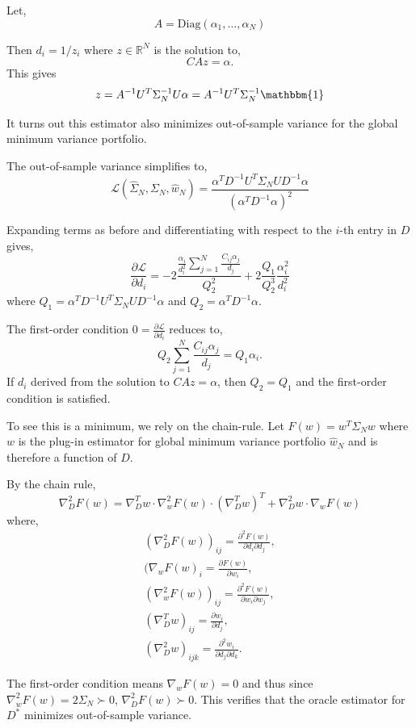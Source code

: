 \documentclass{article}
\begin{document}
Let,
$$
	A = \mathrm{Diag}(\alpha_1, \ldots, \alpha_N)
$$

Then ${d}_i = 1 / z_i$ where $z \in \mathbb{R}^N$ is the solution to,
$$
	C A z = \alpha.
$$
This gives
$$
	z = A^{-1} U^T \Sigma_N^{-1} U \alpha
		 = A^{-1} U^T \Sigma_N^{-1} \mathbbm{1}
$$

It turns out this estimator also minimizes out-of-sample variance for the global
minimum variance portfolio.  

The out-of-sample variance simplifies to,
$$
  \mathcal{L}(\hat{\Sigma}_N, \Sigma_N, \hat{w}_N) = \frac
  	{\alpha^T D^{-1} U^T \Sigma_N U D^{-1} \alpha}
  	{\left( \alpha^T D^{-1} \alpha\right)^2}
$$

Expanding terms as before and differentiating with respect to the $i$-th entry
in $D$ gives,
$$
  \frac{\partial\mathcal{L}}{\partial d_i} = -2 \frac
  	{ \frac{\alpha_i}{d_i^2} \sum_{j=1}^N \frac{C_{ij}\alpha_j}{d_j} }{ Q_2^2 }
    + 2\frac{ Q_1 }{ Q_2^3 } \frac{\alpha_i^2}{d_i^2}
$$
where $Q_1 = \alpha^T D^{-1} U^T \Sigma_N U D^{-1} \alpha$ and $Q_2 = \alpha^T
D^{-1} \alpha$.

The first-order condition $0 = \frac{\partial\mathcal{L}}{\partial d_i}$ reduces
to,
$$
  Q_2 \sum_{j=1}^N \frac{C_{ij}\alpha_j}{d_j}
   = Q_1 \alpha_i.
$$
If $d_i$ derived from the solution to $C A z = \alpha$, then $Q_2 = Q_1$ and the
first-order condition is satisfied.

To see this is a minimum, we rely on the chain-rule.  Let $F(w) = w^T \Sigma_N
w$ where $w$ is the plug-in estimator for global minimum variance portfolio
$\hat{w}_N$ and is therefore a function of $D$.

By the chain rule,
$$
	\nabla_D^2 F(w)
		 = \nabla_D^T w \cdot \nabla_w^2 F(w) \cdot (\nabla_D^T w)^T
		 	+ \nabla_D^2 w \cdot \nabla_w F(w)
$$
where,
\begin{gather*}
	(\nabla_D^2 F(w))_{ij} = \frac{\partial^2 F(w)}
																{\partial d_i \partial d_j},\\
	(\nabla_w F(w)_{i} = \frac{\partial F(w)}{\partial w_i},\\	
	(\nabla_w^2 F(w))_{ij} = \frac{\partial^2 F(w)}
																{\partial w_i \partial w_j},\\									
	(\nabla_D^T w)_{ij} = \frac{\partial w_i}{\partial d_j},\\													
	(\nabla_D^2 w)_{ijk} = \frac{\partial^2 w_i}
																{\partial d_j\partial d_k}.
\end{gather*}

The first-order condition means $\nabla_w F(w) = 0$ and thus since $\nabla_w^2
F(w) = 2\Sigma_N \succ 0$, $\nabla_D^2 F(w) \succ 0$.  This verifies that the
oracle estimator for $D^*$ minimizes out-of-sample variance.
\end{document}

